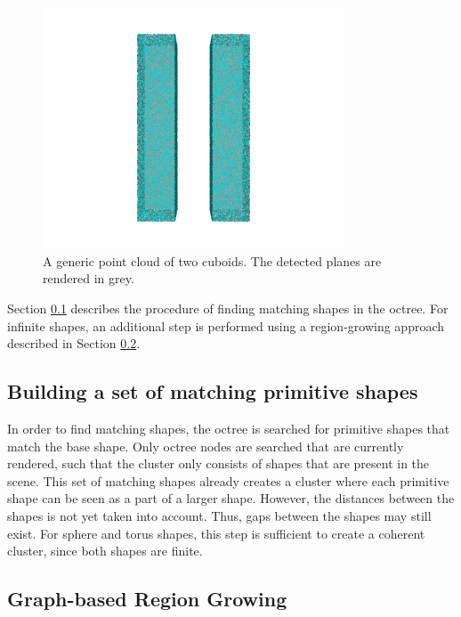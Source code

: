 \begin{figure}
    \centering
    \includegraphics[width=0.8\textwidth]{Shape_Detection/cuboids.png}
    \caption[Point cloud consisting of two cuboids.]
		{A generic point cloud of two cuboids. The detected planes are rendered in grey.}
    \label{fig:cuboids}
\end{figure}

Section \ref{sec:matchingSetBuilding} describes the procedure of finding matching shapes in the octree. For infinite shapes, an additional step is performed using a region-growing approach described in Section \ref{sec:regionGrowing}. 


\subsection{Building a set of matching primitive shapes}
\label{sec:matchingSetBuilding}

In order to find matching shapes, the octree is searched for primitive shapes that match the base shape. Only octree nodes are searched that are currently rendered, such that the cluster only consists of shapes that are present in the scene. This set of matching shapes already creates a cluster where each primitive shape can be seen as a part of a larger shape. However, the distances between the shapes is not yet  taken into account. Thus, gaps between the shapes may still exist. 
For sphere and torus shapes, this step is sufficient to create a coherent cluster, since both shapes are finite. 


\subsection{Graph-based Region Growing}
\label{sec:regionGrowing}

